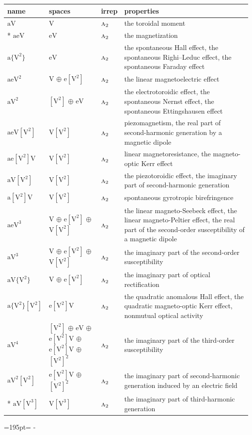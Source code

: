 \documentclass[10pt,a4paper]{article}
\newcommand{\needspace}[1]{\par\penalty-100\begingroup\dimen0=#1\relax\dimen2=\pagegoal
  \advance\dimen2-\pagetotal\ifdim\dimen0>\dimen2\relax\ifdim\dimen2>0pt\vfil\break\fi\fi
  \endgroup}
\numberwithin{equation}{section}
\newcommand{\irr}[1]{\text{\normalfont\scshape #1}}
\newcommand{\jahn}[1]{\mathrm{#1}}
\newlength{\fillwidth}\newlength{\cellwidth}\newlength{\colwidth}
\begin{document}
{\begin{longtable}{@{}lll>{\RaggedRight\arraybackslash}p{\fillwidth}@{}}
name & spaces & irrep & properties\\\midrule\endhead
\bottomrule\endfoot\endlastfoot
$\jahn{aV}$ & $\jahn{V}$ & $\irr{a}_{2}$ & the toroidal moment\\*
$\jahn{aeV}$ & $\jahn{eV}$ & $\irr{a}_{2}$ & the magnetization\\
$\jahn{a\{V^{2}\}}$ & $\jahn{eV}$ & $\irr{a}_{2}$ & the spontaneous Hall effect, the spontaneous Righi–Leduc effect, the spontaneous Faraday effect\\
$\jahn{aeV^{2}}$ & $\jahn{V}$ $\oplus$ $\jahn{e[V^{2}]}$ & $\irr{a}_{2}$ & the linear magnetoelectric effect\\
$\jahn{aV^{2}}$ & $\jahn{[V^{2}]}$ $\oplus$ $\jahn{eV}$ & $\irr{a}_{2}$ & the electrotoroidic effect, the spontaneous Nernst effect, the spontaneous Ettingshausen effect\\
$\jahn{aeV[V^{2}]}$ & $\jahn{V[V^{2}]}$ & $\irr{a}_{2}$ & piezomagnetism, the real part of second-harmonic generation by a magnetic dipole\\
$\jahn{ae[V^{2}]V}$ & $\jahn{V[V^{2}]}$ & $\irr{a}_{2}$ & linear magnetoresistance, the magneto-optic Kerr effect\\
$\jahn{aV[V^{2}]}$ & $\jahn{V[V^{2}]}$ & $\irr{a}_{2}$ & the piezotoroidic effect, the imaginary part of second-harmonic generation\\
$\jahn{a[V^{2}]V}$ & $\jahn{V[V^{2}]}$ & $\irr{a}_{2}$ & spontaneous gyrotropic birefringence\\
$\jahn{aeV^{3}}$ & $\jahn{V}$ $\oplus$ $\jahn{e[V^{2}]}$ $\oplus$ $\jahn{V[V^{2}]}$ & $\irr{a}_{2}$ & the linear magneto-Seebeck effect, the linear magneto-Peltier effect, the real part of the second-order susceptibility of a magnetic dipole\\
$\jahn{aV^{3}}$ & $\jahn{V}$ $\oplus$ $\jahn{e[V^{2}]}$ $\oplus$ $\jahn{V[V^{2}]}$ & $\irr{a}_{2}$ & the imaginary part of the second-order susceptibility\\
$\jahn{aV\{V^{2}\}}$ & $\jahn{V}$ $\oplus$ $\jahn{e[V^{2}]}$ & $\irr{a}_{2}$ & the imaginary part of optical rectification\\
$\jahn{a\{V^{2}\}[V^{2}]}$ & $\jahn{e[V^{2}]V}$ & $\irr{a}_{2}$ & the quadratic anomalous Hall effect, the quadratic magneto-optic Kerr effect, nonmutual optical activity\\
$\jahn{aV^{4}}$ & $\jahn{[V^{2}]}$ $\oplus$ $\jahn{eV}$ $\oplus$ $\jahn{e[V^{2}]V}$ $\oplus$ $\jahn{e[V^{2}]V}$ $\oplus$ $\jahn{[V^{2}]^{2}}$ & $\irr{a}_{2}$ & the imaginary part of the third-order susceptibility\\
$\jahn{aV^{2}[V^{2}]}$ & $\jahn{e[V^{2}]V}$ $\oplus$ $\jahn{[V^{2}]^{2}}$ & $\irr{a}_{2}$ & the imaginary part of second-harmonic generation induced by an electric field\\*
$\jahn{aV[V^{3}]}$ & $\jahn{V[V^{3}]}$ & $\irr{a}_{2}$ & the imaginary part of third-harmonic generation\\
\bottomrule\end{longtable}}
\needspace{195pt}
\end{document}
